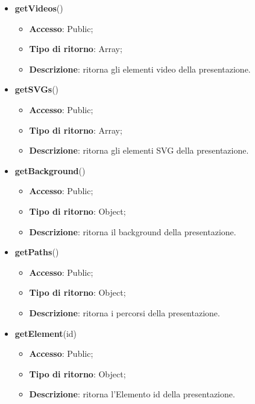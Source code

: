 {\begin{itemize}
\begin{itemize}
				\item \textbf{Accesso}: Public;
				\item \textbf{Tipo di ritorno}: Array;
				\item \textbf{Descrizione}: ritorna gli elementi audio della presentazione.
			\end{itemize}
			\item \textbf{getVideos}()
			\begin{itemize}
				\item \textbf{Accesso}: Public;
				\item \textbf{Tipo di ritorno}: Array;
				\item \textbf{Descrizione}: ritorna gli elementi video della presentazione.
			\end{itemize}
			\item \textbf{getSVGs}()
			\begin{itemize}
				\item \textbf{Accesso}: Public;
				\item \textbf{Tipo di ritorno}: Array;
				\item \textbf{Descrizione}: ritorna gli elementi SVG della presentazione.
			\end{itemize}
			\item \textbf{getBackground}()
			\begin{itemize}
				\item \textbf{Accesso}: Public;
				\item \textbf{Tipo di ritorno}: Object;
				\item \textbf{Descrizione}: ritorna il background della presentazione.
			\end{itemize}
			\item \textbf{getPaths}()
			\begin{itemize}
				\item \textbf{Accesso}: Public;
				\item \textbf{Tipo di ritorno}: Object;
				\item \textbf{Descrizione}: ritorna i percorsi della presentazione.
			\end{itemize}
			\item \textbf{getElement}(id)
			\begin{itemize}
				\item \textbf{Accesso}: Public;
				\item \textbf{Tipo di ritorno}: Object;
				\item \textbf{Descrizione}: ritorna l'Elemento id della presentazione.

\end{itemize}
\end{itemize}}
